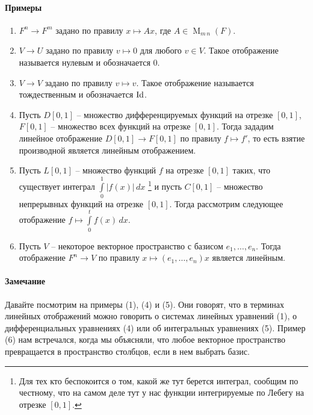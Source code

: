 \paragraph{Примеры}
\begin{enumerate}
\item $F^n \to F^m$ задано по правилу $x\mapsto Ax$, где $A\in \operatorname{M}_{m\,n}(F)$.

\item $V\to U$ задано по правилу $v\mapsto 0$ для любого $v\in V$.
Такое отображение называется нулевым и обозначается $0$.

\item $V\to V$ задано по правилу $v\mapsto v$.
Такое отображение называется тождественным и обозначается $\operatorname{Id}$.

\item Пусть $D[0,1]$ -- множество дифференцируемых функций на отрезке $[0,1]$, $F[0,1]$ -- множество всех функций на отрезке $[0,1]$.
Тогда зададим линейное отображение $D[0,1]\to F[0,1]$ по правилу $f\mapsto f'$, то есть взятие производной является линейным отображением.

\item Пусть $L[0,1]$ -- множество функций $f$ на отрезке $[0,1]$ таких, что существует интеграл $\int\limits_0^1 |f(x)|\,dx$%
\footnote{Для тех кто беспокоится о том, какой же тут берется интеграл, сообщим по честному, что на самом деле тут у нас функции интегрируемые по Лебегу на отрезке $[0,1]$.}
и пусть $C[0,1]$ -- множество непрерывных функций на отрезке $[0,1]$.
Тогда рассмотрим следующее отображение $f\mapsto \int\limits_0^t f(x)\,dx$.

\item Пусть $V$ -- некоторое векторное пространство с базисом $e_1,\ldots, e_n$.
Тогда отображение $F^n \to V$ по правилу $x \mapsto (e_1,\ldots,e_n)x$ является линейным.
\end{enumerate}

\paragraph{Замечание}

Давайте посмотрим на примеры (1), (4) и (5).
Они говорят, что в терминах линейных отображений можно говорить о системах линейных уравнений (1), о дифференциальных уравнениях (4) или об интегральных уравнениях (5).
Пример (6) нам встречался, когда мы объясняли, что любое векторное пространство превращается в пространство столбцов, если в нем выбрать базис.


